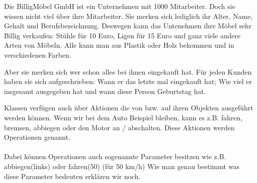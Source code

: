 \begin{enumerate}
Die BilligMöbel GmbH ist ein Unternehmen mit 1000 Mitarbeiter. Doch sie wissen nicht viel über ihre Mitarbeiter. Sie merken sich lediglich ihr Alter, Name, Gehalt und Berufsbezeichnung. Deswegen kann das Untenehmen ihre Möbel sehr Billig verkaufen: Stühle für 10 Euro, Ligen für 15 Euro und ganz viele andere Arten von Möbeln. Alle kann man aus Plastik oder Holz bekommen und in verschiedenen Farben. 

Aber sie merken sich wer schon alles bei ihnen eingekauft hat. Für jeden Kunden haben sie sich aufgeschrieben: Wann er das letzte mal eingekauft hat; Wie viel er insgesamt ausgegeben hat und wann diese Person Geburtstag hat.
\end{enumerate}
\begin{Infobox}
Klassen verfügen auch über Aktionen die von bzw. auf ihren Objekten ausgeführt werden können. Wenn wir bei dem Auto Beispiel bleiben, kann es z.B. fahren, bremsen, abbiegen oder den Motor an / abschalten. Diese Aktionen werden Operationen genannt.
\paragraph{}
Dabei können Operationen auch sogenannte Parameter besitzen wie z.B. abbiegen(links) oder fahren(50) (für 50 km/h) Wie man genau bestimmt was diese Parameter bedeuten erklären wir noch.
\end{Infobox}
